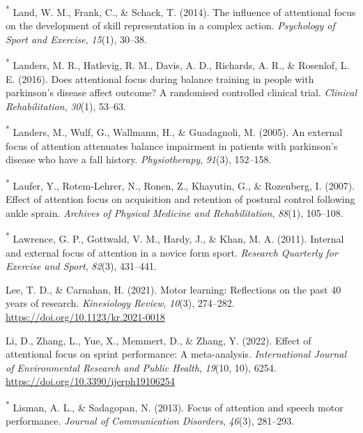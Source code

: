 \documentclass[
  man, donotrepeattitle,floatsintext]{apa7}
\newlength{\cslhangindent}
\newlength{\cslentryspacingunit} %
\newenvironment{CSLReferences}[2] %
 {%
  \setlength{\parindent}{0pt}
  \ifodd #1
  \let\oldpar\par
  \def\par{\hangindent=\cslhangindent\oldpar}
  \fi
  \setlength{\parskip}{#2\cslentryspacingunit}
 }%
 {}
\begin{document}
\begin{CSLReferences}{1}{0}
\leavevmode{}%
\textsuperscript{*} Land, W. M., Frank, C., \& Schack, T. (2014). The influence of attentional focus on the development of skill representation in a complex action. \emph{Psychology of Sport and Exercise}, \emph{15}(1), 30--38.

\leavevmode{}%
\textsuperscript{*} Landers, M. R., Hatlevig, R. M., Davis, A. D., Richards, A. R., \& Rosenlof, L. E. (2016). Does attentional focus during balance training in people with parkinson's disease affect outcome? A randomised controlled clinical trial. \emph{Clinical Rehabilitation}, \emph{30}(1), 53--63.

\leavevmode{}%
\textsuperscript{*} Landers, M., Wulf, G., Wallmann, H., \& Guadagnoli, M. (2005). An external focus of attention attenuates balance impairment in patients with parkinson's disease who have a fall history. \emph{Physiotherapy}, \emph{91}(3), 152--158.

\leavevmode{}%
\textsuperscript{*} Laufer, Y., Rotem-Lehrer, N., Ronen, Z., Khayutin, G., \& Rozenberg, I. (2007). Effect of attention focus on acquisition and retention of postural control following ankle sprain. \emph{Archives of Physical Medicine and Rehabilitation}, \emph{88}(1), 105--108.

\leavevmode{}%
\textsuperscript{*} Lawrence, G. P., Gottwald, V. M., Hardy, J., \& Khan, M. A. (2011). Internal and external focus of attention in a novice form sport. \emph{Research Quarterly for Exercise and Sport}, \emph{82}(3), 431--441.

\leavevmode{}%
Lee, T. D., \& Carnahan, H. (2021). Motor learning: {Reflections} on the past 40 years of research. \emph{Kinesiology Review}, \emph{10}(3), 274--282. \url{https://doi.org/10.1123/kr.2021-0018}

\leavevmode{}%
Li, D., Zhang, L., Yue, X., Memmert, D., \& Zhang, Y. (2022). Effect of attentional focus on sprint performance: {A} meta-analysis. \emph{International Journal of Environmental Research and Public Health}, \emph{19}(10, 10), 6254. \url{https://doi.org/10.3390/ijerph19106254}

\leavevmode{}%
\textsuperscript{*} Lisman, A. L., \& Sadagopan, N. (2013). Focus of attention and speech motor performance. \emph{Journal of Communication Disorders}, \emph{46}(3), 281--293.


\end{CSLReferences}
\end{document}
